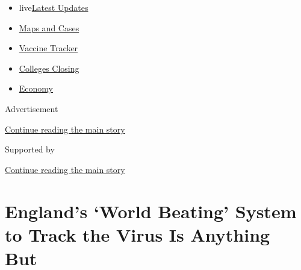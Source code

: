 \begin{itemize}
\tightlist
\item
  live\href{https://www.nytimes3xbfgragh.onion/2020/08/20/world/coronavirus-covid.html?name=styln-coronavirus-national\&region=TOP_BANNER\&variant=undefined\&block=storyline_menu_recirc\&action=click\&pgtype=Article\&impression_id=bf84ac01-e385-11ea-a4ee-ebb6d55f184c}{Latest
  Updates}
\item
  \href{https://www.nytimes3xbfgragh.onion/interactive/2020/us/coronavirus-us-cases.html?name=styln-coronavirus-national\&region=TOP_BANNER\&variant=undefined\&block=storyline_menu_recirc\&action=click\&pgtype=Article\&impression_id=bf84d310-e385-11ea-a4ee-ebb6d55f184c}{Maps
  and Cases}
\item
  \href{https://www.nytimes3xbfgragh.onion/interactive/2020/science/coronavirus-vaccine-tracker.html?name=styln-coronavirus-national\&region=TOP_BANNER\&variant=undefined\&block=storyline_menu_recirc\&action=click\&pgtype=Article\&impression_id=bf84d311-e385-11ea-a4ee-ebb6d55f184c}{Vaccine
  Tracker}
\item
  \href{https://www.nytimes3xbfgragh.onion/2020/08/19/us/colleges-closing-covid.html?name=styln-coronavirus-national\&region=TOP_BANNER\&variant=undefined\&block=storyline_menu_recirc\&action=click\&pgtype=Article\&impression_id=bf84d312-e385-11ea-a4ee-ebb6d55f184c}{Colleges
  Closing}
\item
  \href{https://www.nytimes3xbfgragh.onion/live/2020/08/20/business/stock-market-today-coronavirus?name=styln-coronavirus-national\&region=TOP_BANNER\&variant=undefined\&block=storyline_menu_recirc\&action=click\&pgtype=Article\&impression_id=bf84d313-e385-11ea-a4ee-ebb6d55f184c}{Economy}
\end{itemize}

Advertisement

\protect\hyperlink{after-top}{Continue reading the main story}

Supported by

\protect\hyperlink{after-sponsor}{Continue reading the main story}

\hypertarget{englands-world-beating-system-to-track-the-virus-is-anything-but}{%
\section{England's `World Beating' System to Track the Virus Is Anything
But}\label{englands-world-beating-system-to-track-the-virus-is-anything-but}}

